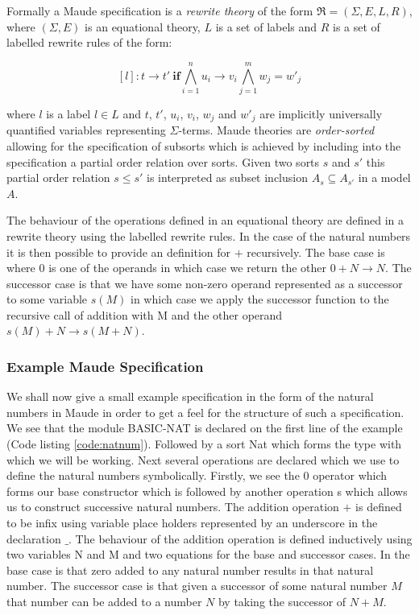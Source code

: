 Formally a Maude specification is a \emph{rewrite theory} of the form $\mathfrak{R}=(\Sigma,E,L,R)$, where  $(\Sigma, E)$ is an equational theory, $L$ is a set of labels and $R$ is a set of labelled rewrite rules of the form:

$$ [l] : t \to t' \ \mathbf{if} \bigwedge^{n}_{i = 1} u_i \to v_i \bigwedge^{m}_{j = 1} w_j = w'_j $$

where $l$ is a label $l \in L$ and $t$, $t'$, $u_i$, $v_i$, $w_j$ and $w'_j$ are implicitly universally quantified variables representing $\Sigma$-terms. Maude theories are \emph{order-sorted} allowing for the specification of subsorts which is achieved by including into the specification a partial order relation over sorts. Given two sorts $s$ and $s'$ this partial order relation $s \leq s'$ is interpreted as subset inclusion $A_s \subseteq A_{s'}$ in a model $A$.

The behaviour of the operations defined in an equational theory are defined in a rewrite theory using the labelled rewrite rules. In the case of the natural numbers it is then possible to provide an definition for $+$ recursively. The base case is where 0 is one of the operands in which case we return the other $0 + N \to N$. The successor case is that we have some non-zero operand represented as a successor to some variable $s(M)$ in which case we apply the successor function to the recursive call of addition with M and the other operand $s(M) + N \to s(M + N)$. 
 

\subsubsection{Example Maude Specification}
We shall now give a small example specification in the form of the natural numbers in Maude in order to get a feel for the structure of such a specification. We see that the module BASIC-NAT is declared on the first line of the example (Code listing \ref{code:natnum}). Followed by a sort Nat which forms the type with which we will be working. Next several operations are declared which we use to define the natural numbers symbolically. Firstly, we see the 0 operator which forms our base constructor which is followed by another operation s which allows us to construct successive natural numbers. The addition operation $+$ is defined to be infix using variable place holders represented by an underscore in the declaration  $\_$. The behaviour of the addition operation is defined inductively using two variables N and M and two equations for the base and successor cases. In the base case is that zero added to any natural number results in that natural number. The successor case is that given a successor of some natural number $M$ that number can be added to a number $N$ by taking the successor of $N+M$.

